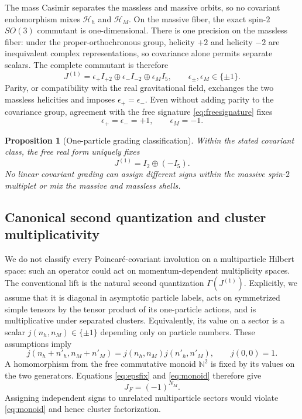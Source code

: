 \documentclass[11pt]{article}
\newtheorem{proposition}[theorem]{Proposition}
\theoremstyle{definition}
\theoremstyle{remark}
\begin{document}
The mass Casimir separates the massless and massive orbits, so no
covariant endomorphism mixes $\mathcal H_h$ and $\mathcal H_M$.  On the
massive fiber, the exact spin-$2$ $SO(3)$ commutant is one-dimensional.
There is one precision on the massless fiber: under the
proper-orthochronous group, helicity $+2$ and helicity $-2$ are
inequivalent complex representations, so covariance alone permits
separate scalars.  The complete commutant is therefore
\begin{equation}\label{eq:commutant}
J^{(1)}=\epsilon_+I_{+2}\oplus\epsilon_-I_{-2}
\oplus\epsilon_MI_5,
\qquad \epsilon_\pm,\epsilon_M\in\{\pm1\}.
\end{equation}
Parity, or compatibility with the real gravitational field, exchanges
the two massless helicities and imposes $\epsilon_+=\epsilon_-$.  Even
without adding parity to the covariance group, agreement with the free
signature \eqref{eq:freesignature} fixes
\begin{equation}\label{eq:epsfix}
\epsilon_+=\epsilon_-=+1,
\qquad \epsilon_M=-1.
\end{equation}

\begin{proposition}[One-particle grading classification]
\label{prop:oneparticlegrading}
Within the stated covariant class, the free real form uniquely fixes
\begin{equation}
J^{(1)}=I_2\oplus(-I_5).
\end{equation}
No linear covariant grading can assign different signs within the
massive spin-$2$ multiplet or mix the massive and massless shells.
\end{proposition}

\subsection{Canonical second quantization and cluster multiplicativity}

We do not classify every Poincar\'e-covariant involution on a
multiparticle Hilbert space: such an operator could act on
momentum-dependent multiplicity spaces.  The conventional lift is the
natural second quantization $\Gamma(J^{(1)})$.  Explicitly, we assume
that it is diagonal in asymptotic particle labels, acts on symmetrized
simple tensors by the tensor product of its one-particle actions, and is
multiplicative under separated clusters.  Equivalently, its value on a
sector is a scalar $j(n_h,n_M)\in\{\pm1\}$ depending only on particle
numbers.  These assumptions imply
\begin{equation}\label{eq:monoid}
j(n_h+n'_h,n_M+n'_M)
=j(n_h,n_M)j(n'_h,n'_M),
\qquad j(0,0)=1.
\end{equation}
A homomorphism from the free commutative monoid $\mathbb N^2$ is fixed by
its values on the two generators.  Equations \eqref{eq:epsfix} and
\eqref{eq:monoid} therefore give
\begin{equation}\label{eq:fockgrading}
\boxed{J_F=(-1)^{N_M}.}
\end{equation}
Assigning independent signs to unrelated multiparticle sectors would
violate \eqref{eq:monoid} and hence cluster factorization.
\end{document}
